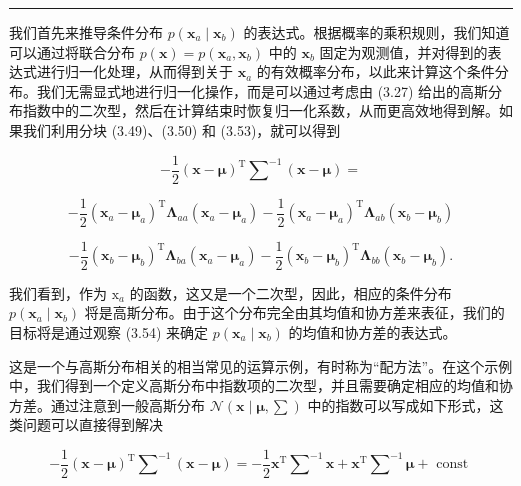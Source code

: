 \documentclass[10pt]{report}
\newcommand{\HRule}{\begin{center}\rule{0.9\linewidth}{0.2mm}\end{center}}
\begin{document}
\HRule

我们首先来推导条件分布 \(p\left( {{\mathbf{x}}_{a} \mid  {\mathbf{x}}_{b}}\right)\) 的表达式。根据概率的乘积规则，我们知道可以通过将联合分布 \(p\left( \mathbf{x}\right)  = p\left( {{\mathbf{x}}_{a},{\mathbf{x}}_{b}}\right)\) 中的 \({\mathbf{x}}_{b}\) 固定为观测值，并对得到的表达式进行归一化处理，从而得到关于 \({\mathbf{x}}_{a}\) 的有效概率分布，以此来计算这个条件分布。我们无需显式地进行归一化操作，而是可以通过考虑由 (3.27) 给出的高斯分布指数中的二次型，然后在计算结束时恢复归一化系数，从而更高效地得到解。如果我们利用分块 (3.49)、(3.50) 和 (3.53)，就可以得到

\[
- \frac{1}{2}{\left( \mathbf{x} - \mathbf{\mu }\right) }^{\mathrm{T}}{\mathbf{\sum }}^{-1}\left( {\mathbf{x} - \mathbf{\mu }}\right)  =
\]

\[
- \frac{1}{2}{\left( {\mathbf{x}}_{a} - {\mathbf{\mu }}_{a}\right) }^{\mathrm{T}}{\mathbf{\Lambda }}_{aa}\left( {{\mathbf{x}}_{a} - {\mathbf{\mu }}_{a}}\right)  - \frac{1}{2}{\left( {\mathbf{x}}_{a} - {\mathbf{\mu }}_{a}\right) }^{\mathrm{T}}{\mathbf{\Lambda }}_{ab}\left( {{\mathbf{x}}_{b} - {\mathbf{\mu }}_{b}}\right)
\]

\[
- \frac{1}{2}{\left( {\mathbf{x}}_{b} - {\mathbf{\mu }}_{b}\right) }^{\mathrm{T}}{\mathbf{\Lambda }}_{ba}\left( {{\mathbf{x}}_{a} - {\mathbf{\mu }}_{a}}\right)  - \frac{1}{2}{\left( {\mathbf{x}}_{b} - {\mathbf{\mu }}_{b}\right) }^{\mathrm{T}}{\mathbf{\Lambda }}_{bb}\left( {{\mathbf{x}}_{b} - {\mathbf{\mu }}_{b}}\right) . \tag{3.54}
\]

我们看到，作为 \({\mathrm{x}}_{a}\) 的函数，这又是一个二次型，因此，相应的条件分布 \(p\left( {{\mathbf{x}}_{a} \mid  {\mathbf{x}}_{b}}\right)\) 将是高斯分布。由于这个分布完全由其均值和协方差来表征，我们的目标将是通过观察 (3.54) 来确定 \(p\left( {{\mathbf{x}}_{a} \mid  {\mathbf{x}}_{b}}\right)\) 的均值和协方差的表达式。

这是一个与高斯分布相关的相当常见的运算示例，有时称为“配方法”。在这个示例中，我们得到一个定义高斯分布中指数项的二次型，并且需要确定相应的均值和协方差。通过注意到一般高斯分布 \(\mathcal{N}\left( {\mathbf{x} \mid  \mathbf{\mu },\mathbf{\sum }}\right)\) 中的指数可以写成如下形式，这类问题可以直接得到解决

\[
- \frac{1}{2}{\left( \mathbf{x} - \mathbf{\mu }\right) }^{\mathrm{T}}{\mathbf{\sum }}^{-1}\left( {\mathbf{x} - \mathbf{\mu }}\right)  =  - \frac{1}{2}{\mathbf{x}}^{\mathrm{T}}{\mathbf{\sum }}^{-1}\mathbf{x} + {\mathbf{x}}^{\mathrm{T}}{\mathbf{\sum }}^{-1}\mathbf{\mu } + \text{ const } \tag{3.55}
\]
\end{document}
